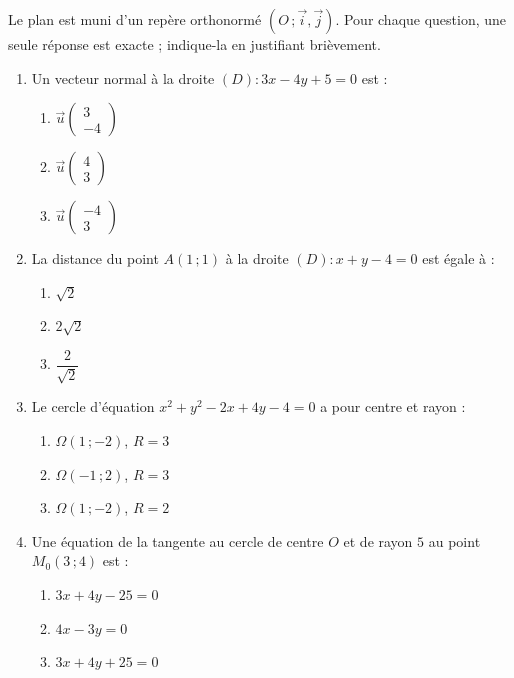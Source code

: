 \documentclass[11pt]{article}
\begin{document}
\begin{exercice}
Le plan est muni d'un repère orthonormé $(O\,;\vec{i},\vec{j})$. Pour chaque question, une seule réponse est exacte ; indique-la en justifiant brièvement.
\begin{enumerate}
\item Un vecteur normal à la droite $(D) : 3x - 4y + 5 = 0$ est :
\begin{enumerate}
\item $\vec{u}\begin{pmatrix} 3 \\ -4 \end{pmatrix}$ \qquad
\item $\vec{u}\begin{pmatrix} 4 \\ 3 \end{pmatrix}$ \qquad
\item $\vec{u}\begin{pmatrix} -4 \\ 3 \end{pmatrix}$
\end{enumerate}
\item La distance du point $A(1\,;1)$ à la droite $(D) : x + y - 4 = 0$ est égale à :
\begin{enumerate}
\item $\sqrt{2}$ \qquad \item $2\sqrt{2}$ \qquad \item $\dfrac{2}{\sqrt{2}}$
\end{enumerate}
\item Le cercle d'équation $x^2 + y^2 - 2x + 4y - 4 = 0$ a pour centre et rayon :
\begin{enumerate}
\item $\Omega(1\,;-2)$, $R = 3$ \qquad \item $\Omega(-1\,;2)$, $R = 3$ \qquad \item $\Omega(1\,;-2)$, $R = 2$
\end{enumerate}
\item Une équation de la tangente au cercle de centre $O$ et de rayon $5$ au point $M_0(3\,;4)$ est :
\begin{enumerate}
\item $3x + 4y - 25 = 0$ \qquad \item $4x - 3y = 0$ \qquad \item $3x + 4y + 25 = 0$
\end{enumerate}
\end{enumerate}
\end{exercice}
\end{document}
